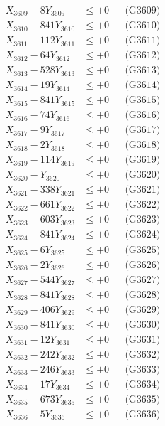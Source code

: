 \documentclass[a4paper,10pt]{article}
\begin{document}
{\begin{align}
X_{3609} - 8Y_{3609} &\leq +0 && \text{(G3609)} \\
X_{3610} - 841Y_{3610} &\leq +0 && \text{(G3610)} \\
\allowbreak
X_{3611} - 112Y_{3611} &\leq +0 && \text{(G3611)} \\
X_{3612} - 64Y_{3612} &\leq +0 && \text{(G3612)} \\
X_{3613} - 528Y_{3613} &\leq +0 && \text{(G3613)} \\
X_{3614} - 19Y_{3614} &\leq +0 && \text{(G3614)} \\
X_{3615} - 841Y_{3615} &\leq +0 && \text{(G3615)} \\
X_{3616} - 74Y_{3616} &\leq +0 && \text{(G3616)} \\
X_{3617} - 9Y_{3617} &\leq +0 && \text{(G3617)} \\
X_{3618} - 2Y_{3618} &\leq +0 && \text{(G3618)} \\
X_{3619} - 114Y_{3619} &\leq +0 && \text{(G3619)} \\
X_{3620} - Y_{3620} &\leq +0 && \text{(G3620)} \\
\allowbreak
X_{3621} - 338Y_{3621} &\leq +0 && \text{(G3621)} \\
X_{3622} - 661Y_{3622} &\leq +0 && \text{(G3622)} \\
X_{3623} - 603Y_{3623} &\leq +0 && \text{(G3623)} \\
X_{3624} - 841Y_{3624} &\leq +0 && \text{(G3624)} \\
X_{3625} - 6Y_{3625} &\leq +0 && \text{(G3625)} \\
X_{3626} - 2Y_{3626} &\leq +0 && \text{(G3626)} \\
X_{3627} - 544Y_{3627} &\leq +0 && \text{(G3627)} \\
X_{3628} - 841Y_{3628} &\leq +0 && \text{(G3628)} \\
X_{3629} - 406Y_{3629} &\leq +0 && \text{(G3629)} \\
X_{3630} - 841Y_{3630} &\leq +0 && \text{(G3630)} \\
\allowbreak
X_{3631} - 12Y_{3631} &\leq +0 && \text{(G3631)} \\
X_{3632} - 242Y_{3632} &\leq +0 && \text{(G3632)} \\
X_{3633} - 246Y_{3633} &\leq +0 && \text{(G3633)} \\
X_{3634} - 17Y_{3634} &\leq +0 && \text{(G3634)} \\
X_{3635} - 673Y_{3635} &\leq +0 && \text{(G3635)} \\
X_{3636} - 5Y_{3636} &\leq +0 && \text{(G3636)} \\

\end{align}}
\end{document}
